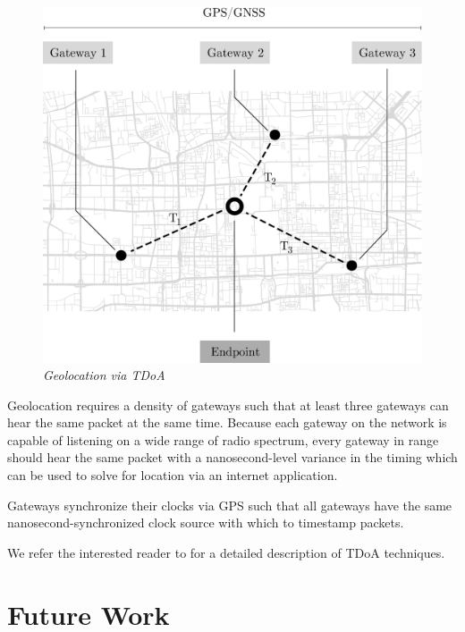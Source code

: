 \documentclass[letterpaper,11pt]{article}
\begin{document}
\begin{figure}[H]
	\begin{center}
  		\includegraphics[scale=0.3]{tdoa.eps}
  		\caption{\textit{Geolocation via TDoA}}
  		\label{fig:tdoa}
 	\end{center}
\end{figure}

Geolocation requires a density of gateways such that at least three gateways can hear the same packet at the same time. Because each gateway on the network is capable of listening on a wide range of radio spectrum, every gateway in range should hear the same packet with a nanosecond-level variance in the timing which can be used to solve for location via an internet application.\newline

Gateways synchronize their clocks via GPS such that all gateways have the same nanosecond-synchronized clock source with which to timestamp packets.\newline

We refer the interested reader to\cite{tdoa} for a detailed description of TDoA techniques.

\newpage

\section{Future Work}
\end{document}
